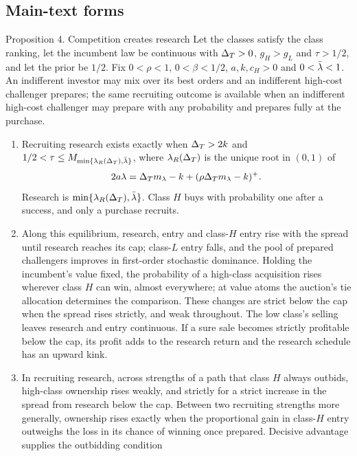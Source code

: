 \subsection*{Main-text forms}
\begin{named}{Proposition 4. Competition creates research}
Let the classes satisfy the class ranking, let the incumbent law be continuous with \(\Delta_T>0\), \(g_H>g_L\)
and \(\tau>1/2\), and let the prior be \(1/2\). Fix \(0<\rho<1\), \(0<\beta<1/2\), \(a,k,c_H>0\) and
\(0<\bar\lambda<1\). An indifferent investor may mix over its best orders and an indifferent high-cost challenger
prepares; the same recruiting outcome is available when an indifferent high-cost challenger may prepare with
any probability and prepares fully at the purchase.
\begin{enumerate}[label=(\alph*),leftmargin=2em]
\item Recruiting research exists exactly when \(\Delta_T>2k\) and
\(1/2<\tau\le M_{\min\{\lambda_R(\Delta_T),\bar\lambda\}}\), where \(\lambda_R(\Delta_T)\) is the unique root in \((0,1)\) of
\[
 2a\lambda=\Delta_T m_\lambda-k+(\rho\Delta_T m_\lambda-k)^+.
\]
Research is \(\min\{\lambda_R(\Delta_T),\bar\lambda\}\). Class \(H\) buys with probability one after a success,
and only a purchase recruits.
\item Along this equilibrium, research, entry and class-\(H\) entry rise with the spread until research reaches
its cap; class-\(L\) entry falls, and the pool of prepared challengers improves in first-order stochastic
dominance. Holding the incumbent's value fixed, the probability of a high-class acquisition rises wherever class
\(H\) can win, almost everywhere; at value atoms the auction's tie allocation determines the comparison.
These changes are strict below the cap when the spread rises strictly, and weak throughout. The low class's
selling leaves research and entry continuous. If a sure sale becomes strictly profitable below the cap, its
profit adds to the research return and the research schedule has an upward kink.
\item In recruiting research, across strengths of a path that class \(H\) always outbids, high-class ownership
rises weakly, and strictly for a strict increase in the spread from research below the cap. Between two
recruiting strengths more generally, ownership rises exactly when the proportional gain in class-\(H\) entry
outweighs the loss in its chance of winning once prepared. Decisive advantage supplies the outbidding condition

\end{enumerate}
\end{named}

